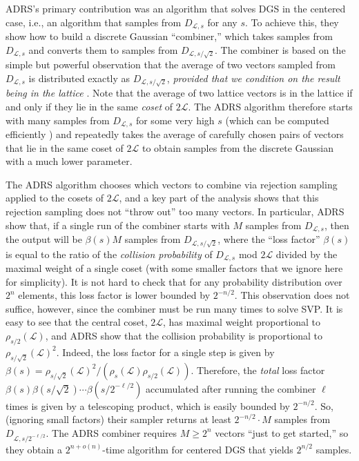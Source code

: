 \documentclass[11pt]{article}
\newcommand{\problem}[1]{\mbox{#1}\xspace}
\newcommand{\scarequotes}[1]{``#1''}
\newcommand{\lat}{\mathcal{L}}
\begin{document}
ADRS's primary contribution was an algorithm that solves \problem{DGS} in the
centered case, i.e., an algorithm that samples from $D_{\lat, s}$ for any $s$.
To achieve this, they show how to build a discrete Gaussian
\scarequotes{combiner,} which takes samples from $D_{\lat, s}$ and converts them
to samples from $D_{\lat, s/\sqrt{2}}$. The combiner is based on the simple but powerful
 observation that the average of two vectors sampled from $D_{\lat, s}$ is
distributed exactly as $D_{\lat, s/\sqrt{2}}$, \emph{provided that we condition
on the result being in the lattice} \cite[Lemma 3.4]{ADRS15}. Note that the
average of two lattice vectors is in the lattice if and only if they lie in the same
\emph{coset} of $2\lat$. The ADRS algorithm therefore starts with many samples
from $D_{\lat, s}$ for some very high $s$ (which can be computed efficiently
\cite{Klein00, GPV08, BLPRS13}) and repeatedly takes the average of carefully chosen pairs of
vectors that lie in the same coset of $2\lat$ to obtain samples from the
discrete Gaussian with a much lower parameter.

The ADRS algorithm chooses which vectors to combine via rejection sampling
applied to the cosets of $2\lat$, and a key part of the analysis shows that this
rejection sampling does not \scarequotes{throw out} too many vectors. In
particular, ADRS show that, if a single run of the combiner starts with $M$
samples from $D_{\lat, s}$,  then the output will be $\beta(s) M $ samples from
$D_{\lat, s/\sqrt{2}}$, where the \scarequotes{loss factor} $\beta(s)$ is equal
to the ratio of the \emph{collision probability} of $D_{\lat, s}$ mod $2\lat$
divided by the maximal weight of a single coset (with some smaller
factors that we ignore here for simplicity). It is not hard to check that
for any probability distribution over $2^n$ elements, this loss factor is lower
bounded by $2^{-n/2}$. This observation does not suffice, however, since the combiner must be run many times to solve \problem{SVP}.
It is easy to see that the central coset,
$2\lat$, has maximal weight proportional to $\rho_{s/2}(\lat)$, and ADRS show that
the collision probability is proportional to $\rho_{s/\sqrt{2}}(\lat)^2$.
Indeed, the loss factor for a single step is given by
$\beta(s) = \rho_{s/\sqrt{2}}(\lat)^2/(\rho_s(\lat)\rho_{s/2}(\lat))$.  Therefore, the
\emph{total} loss factor $\beta(s) \beta(s/\sqrt{2}) \cdots
\beta(s/2^{-\ell/2})$ accumulated after running the combiner $\ell$ times is
given by a telescoping product, which is easily bounded by $2^{-n/2}$. So, (ignoring small factors) their sampler returns at least $2^{-n/2}\cdot M$ samples from
$D_{\lat, s/2^{-\ell/2}}$.
The ADRS combiner requires $M \geq
2^{n}$ vectors \scarequotes{just to get started,} so they obtain a $2^{n+
o(n)}$-time algorithm for centered $\problem{DGS}$ that yields $2^{n/2}$
samples.
\end{document}
